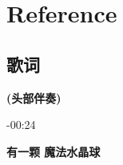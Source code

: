 \documentclass[a4paper]{article}
\begin{document}

\section{Reference}

\subsection{歌词}

\textbf{(头部伴奏)}

-00:24

\textbf{有一颗 魔法水晶球}
\end{document}
